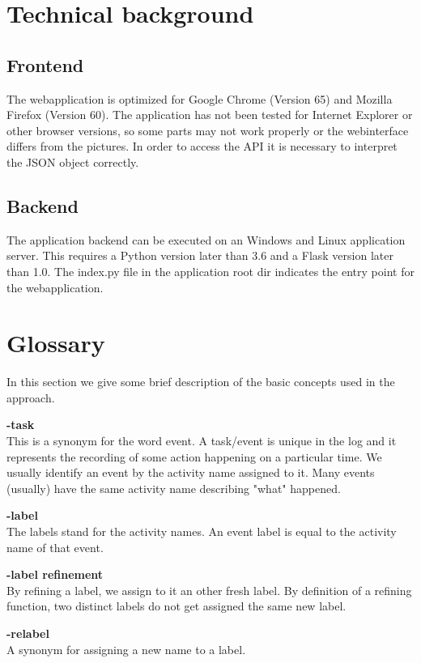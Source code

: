 \documentclass[notitlepage]{article}
\begin{document}
\begin{flushleft}
\section{Technical background}

\subsection{Frontend}
The webapplication is optimized for Google Chrome (Version 65) and Mozilla Firefox (Version 60). 
The application has not been tested for Internet Explorer or other browser versions, so some parts may not work properly 
or the webinterface differs from the pictures. In order to access the API it is necessary to interpret the JSON object correctly.


\subsection{Backend}
The application backend can be executed on an Windows and Linux application server. 
This requires a Python version later than 3.6 and a Flask version later than 1.0. The index.py file in the application root dir indicates the 
entry point for the webapplication.

\section{Glossary}
In this section we give some brief description of the basic concepts used in the approach.
\medskip

\textbf{-task}\\
This is a synonym for the word event.
A task/event is unique in the log and it represents the recording of some action happening on a particular time.
We usually identify an event by the activity name assigned to it.
Many events (usually) have the same activity name describing "what" happened.
\medskip

\textbf{-label}\\
The labels stand for the activity names.
An event label is equal to the activity name of that event.
\medskip

\textbf{-label refinement}\\
By refining a label, we assign to it an other fresh label.
By definition of a refining function, two distinct labels do not get assigned the same new label.
\medskip

\textbf{-relabel}\\
A synonym for assigning a new name to a label.
\medskip


\end{flushleft}
\end{document}
